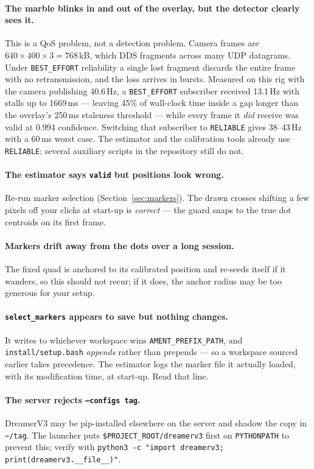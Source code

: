 \documentclass[11pt,a4paper]{article}
\newcommand{\cmd}[1]{\texttt{\small #1}}
\newcommand{\file}[1]{\texttt{\small #1}}
\begin{document}
\paragraph{The marble blinks in and out of the overlay, but the detector clearly
sees it.} This is a QoS problem, not a detection problem. Camera frames are
$640\times400\times3 = 768$\,kB, which DDS fragments across many UDP datagrams.
Under \cmd{BEST\_EFFORT} reliability a single lost fragment discards the entire
frame with no retransmission, and the loss arrives in bursts. Measured on this
rig with the camera publishing 40.6\,Hz, a \cmd{BEST\_EFFORT} subscriber received
13.1\,Hz with stalls up to 1669\,ms --- leaving 45\% of wall-clock time inside a
gap longer than the overlay's 250\,ms staleness threshold --- while every frame
it \emph{did} receive was valid at 0.994 confidence. Switching that subscriber to
\cmd{RELIABLE} gives 38--43\,Hz with a 60\,ms worst case. The estimator and the
calibration tools already use \cmd{RELIABLE}; several auxiliary scripts in the
repository still do not.

\paragraph{The estimator says \cmd{valid} but positions look wrong.} Re-run
marker selection (Section~\ref{sec:markers}). The drawn crosses shifting a few
pixels off your clicks at start-up is \emph{correct} --- the guard snaps to the
true dot centroids on its first frame.

\paragraph{Markers drift away from the dots over a long session.} The fixed quad
is anchored to its calibrated position and re-seeds itself if it wanders, so this
should not recur; if it does, the anchor radius may be too generous for your
setup.

\paragraph{\cmd{select\_markers} appears to save but nothing changes.} It writes
to whichever workspace wins \cmd{AMENT\_PREFIX\_PATH}, and
\file{install/setup.bash} \emph{appends} rather than prepends --- so a workspace
sourced earlier takes precedence. The estimator logs the marker file it actually
loaded, with its modification time, at start-up. Read that line.

\paragraph{The server rejects \cmd{--configs tag}.} DreamerV3 may be
pip-installed elsewhere on the server and shadow the copy in \file{\~{}/tag}. The
launcher puts \file{\$PROJECT\_ROOT/dreamerv3} first on \cmd{PYTHONPATH} to
prevent this; verify with
\cmd{python3 -c "import dreamerv3; print(dreamerv3.\_\_file\_\_)"}.
\end{document}
